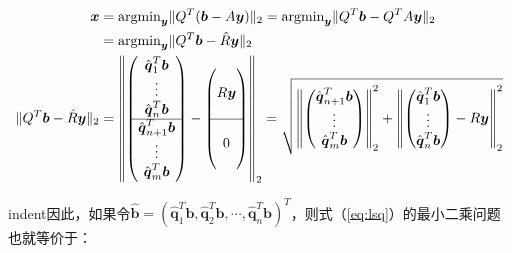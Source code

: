 \documentclass[UTF8,nofonts]{ctexart}
\begin{document}
\begin{equation}
\label{eq:lsqprocd}
\begin{aligned}
\boldsymbol{x} &=
\text{argmin}_{\boldsymbol{y}}\|Q^T(\boldsymbol{b}-A\boldsymbol{y})\|_2=
\text{argmin}_{\boldsymbol{y}}\|Q^T\boldsymbol{b}-Q^TA\boldsymbol{y}\|_2 \\
&= \text{argmin}_{\boldsymbol{y}}\|Q^T\boldsymbol{b}-\hat{R}\boldsymbol{y}\|_2 \\
\|Q^T\boldsymbol{b}-\hat{R}\boldsymbol{y}\|_2 &=
\left\|
\begin{pmatrix}
	\hat{\boldsymbol{q}}_1^T\boldsymbol{b} \\ \vdots \\
	\hat{\boldsymbol{q}}_n^T\boldsymbol{b} \\ \cline{1-1}
	\hat{\boldsymbol{q}}_{n+1}^T\boldsymbol{b} \\ \vdots \\
	\hat{\boldsymbol{q}}_m^T\boldsymbol{b} \\
\end{pmatrix}-
\begin{pmatrix}
	~ \\ R\boldsymbol{y} \\ ~ \\ \cline{1-1}
	~ \\ 0 \\ ~
\end{pmatrix}
\right\|_2=
\sqrt{
	\left\|
	\begin{pmatrix}
		\hat{\boldsymbol{q}}_{n+1}^T\boldsymbol{b} \\
		\vdots \\
		\hat{\boldsymbol{q}}_{m}^T\boldsymbol{b} \\
	\end{pmatrix}
	\right\|_2^2 +
	\left\|
		\begin{pmatrix}
			\hat{\boldsymbol{q}}_1^T\boldsymbol{b} \\
			\vdots \\
			\hat{\boldsymbol{q}}_n^T\boldsymbol{b} \\
		\end{pmatrix}-R\boldsymbol{y}
	\right\|_2^2
}
\end{aligned}
\end{equation}

indent因此，如果令$\hat{\boldsymbol{b}}=\left(\hat{\boldsymbol{q}}_1^T\boldsymbol{b},\hat{\boldsymbol{q}}_2^T\boldsymbol{b},\cdots,\hat{\boldsymbol{q}}_n^T\boldsymbol{b}\right)^T$，则式（\ref{eq:lsq}）的最小二乘问题也就等价于：
\end{document}
